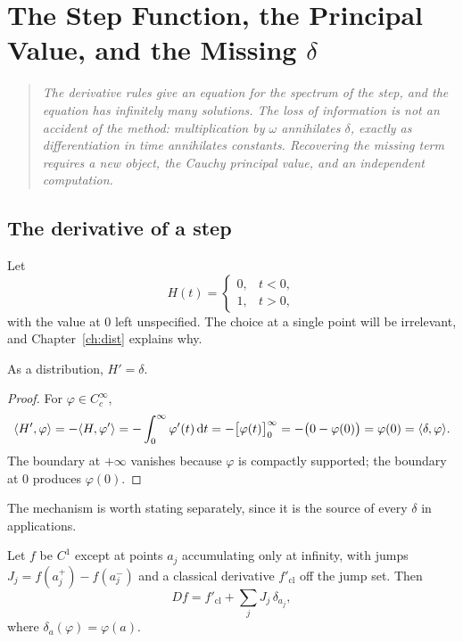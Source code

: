 \chapter{The Step Function, the Principal Value, and the Missing \texorpdfstring{$\delta$}{delta}}
\label{ch:step}

\begin{quote}
\itshape
The derivative rules give an equation for the spectrum of the step, and the equation has infinitely
many solutions. The loss of information is not an accident of the method: multiplication by
$\omega$ annihilates $\delta$, exactly as differentiation in time annihilates constants. Recovering
the missing term requires a new object, the Cauchy principal value, and an independent computation.
\end{quote}

\section{The derivative of a step}

Let
\begin{equation}
H(t)=\begin{cases}0,&t<0,\\ 1,& t>0,\end{cases}
\label{eq:H}
\end{equation}
with the value at $0$ left unspecified. The choice at a single point will be irrelevant, and
Chapter~\ref{ch:dist} explains why.

\begin{proposition}\label{prop:Hprime}
As a distribution, $H'=\delta$.
\end{proposition}

\begin{proof}
For $\varphi\in C_{c}^{\infty}$,
\begin{equation}
\langle H',\varphi\rangle=-\langle H,\varphi'\rangle=-\int_{0}^{\infty}\varphi'(t)\,\mathrm{d} t
=-\big[\varphi(t)\big]_{0}^{\infty}=-\big(0-\varphi(0)\big)=\varphi(0)=\langle \delta,\varphi\rangle.
\end{equation}
The boundary at $+\infty$ vanishes because $\varphi$ is compactly supported; the boundary at $0$
produces $\varphi(0)$.
\end{proof}

The mechanism is worth stating separately, since it is the source of every $\delta$ in applications.

\begin{proposition}\label{prop:jump}
Let $f$ be $C^{1}$ except at points $a_{j}$ accumulating only at infinity, with jumps
$J_{j}=f(a_{j}^{+})-f(a_{j}^{-})$ and a classical derivative $f'_{\mathrm{cl}}$ off the jump set.
Then
\begin{equation}
Df=f'_{\mathrm{cl}}+\sum_{j}J_{j}\,\delta_{a_{j}},
\label{eq:jump}
\end{equation}
where $\delta_{a}(\varphi)=\varphi(a)$.
\end{proposition}

